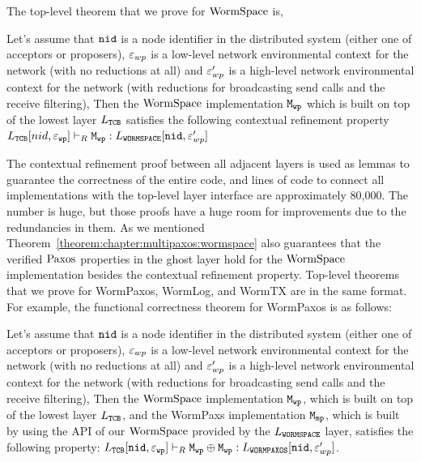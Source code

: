 The top-level theorem that we prove for $\mathrm{WormSpace}$ is, 
\begin{theorem}
\label{theorem:chapter:multipaxos:wormspace}
Let's assume that ${\mathrm{\texttt{nid}}}$ is a node identifier in the distributed system (either one of acceptors or proposers),
${\varepsilon}_{wp}$ is a low-level network environmental context for the network (with no reductions at all) and 
${\varepsilon}_{wp}'$ is a high-level network environmental context for the network (with reductions for broadcasting send calls and the
receive filtering),
 Then the $\mathrm{WormSpace}$ implementation ${\mathrm{\texttt{M}}}_{{\mathrm{\texttt{wp}}}}$ which is built on top of the lowest layer $L_{{\mathrm{\texttt{TCB}}}}$ satisfies 
 the following contextual refinement property
$L_{{\mathrm{\texttt{TCB}}}}[nid, {\varepsilon}_{{\mathrm{\texttt{wp}}}}] \vdash_{R} {\mathrm{\texttt{M}}}_{{\mathrm{\texttt{wp}}}} : L_{{\mathrm{\texttt{WORMSPACE}}}}[{\mathrm{\texttt{nid}}}, {\varepsilon}_{wp}']$
\end{theorem}
The contextual refinement proof between all adjacent layers is used as lemmas to guarantee the correctness of the entire code,
and lines of code to connect all implementations with the top-level layer interface are approximately 80,000. 
The number is huge, but those proofs have a huge room for improvements due to the redundancies in them. 
As we mentioned
Theorem~\ref{theorem:chapter:multipaxos:wormspace} also guarantees that the verified $\mathrm{Paxos}$ properties in the ghost layer 
hold for the $\mathrm{WormSpace}$ implementation besides the contextual refinement property.
Top-level theorems that we prove for WormPaxos, WormLog, and WormTX are in the same format.
For example, the functional correctness theorem for WormPaxos is as follows:
\begin{theorem}
\label{theorem:chapter:multipaxos:wompaxos}
Let's assume that ${\mathrm{\texttt{nid}}}$ is a node identifier in the distributed system (either one of acceptors or proposers),
${\varepsilon}_{wp}$ is a low-level network environmental context for the network (with no reductions at all) and 
${\varepsilon}_{wp}'$ is a high-level network environmental context for the network (with reductions for broadcasting send calls and the
receive filtering),
 Then the $\mathrm{WormSpace}$ implementation ${\mathrm{\texttt{M}}}_{{\mathrm{\texttt{wp}}}}$, which is built on top of the lowest layer $L_{{\mathrm{\texttt{TCB}}}}$,  and 
 the WormPaxs implementation ${\mathrm{\texttt{M}}}_{{\mathrm{\texttt{mp}}}}$, which is built by using the API of our $\mathrm{WormSpace}$ provided by the $L_{{\mathrm{\texttt{WORMSPACE}}}}$ layer, satisfies the following property:
 $L_{{\mathrm{\texttt{TCB}}}}[{\mathrm{\texttt{nid}}}, {\varepsilon}_{{\mathrm{\texttt{wp}}}}] \vdash_{R} {{\mathrm{\texttt{M}}}_{{\mathrm{\texttt{wp}}}}} \oplus {{\mathrm{\texttt{M}}}_{{\mathrm{\texttt{wp}}}}} : L_{{\mathrm{\texttt{WORMPAXOS}}}}[{\mathrm{\texttt{nid}}}, {\varepsilon}_{wp}']$.
\end{theorem}
